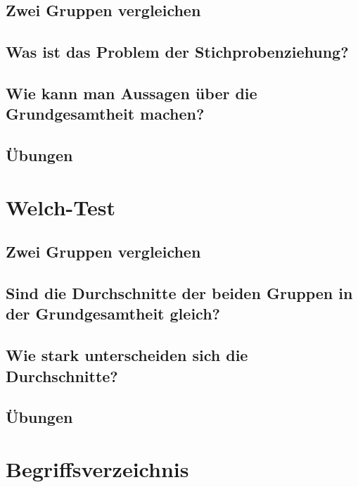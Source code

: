 \documentclass[
]{book}
\theoremstyle{definition}
\theoremstyle{definition}
\theoremstyle{definition}
\theoremstyle{definition}
\theoremstyle{remark}
\begin{document}
\section{Zwei Gruppen vergleichen}\label{zwei-gruppen-vergleichen}

\section{Was ist das Problem der Stichprobenziehung?}\label{was-ist-das-problem-der-stichprobenziehung}

\section{Wie kann man Aussagen über die Grundgesamtheit machen?}\label{wie-kann-man-aussagen-uxfcber-die-grundgesamtheit-machen}

\section{Übungen}\label{uxfcbungen-3}

\chapter{Welch-Test}\label{welch-test}

\section{Zwei Gruppen vergleichen}\label{zwei-gruppen-vergleichen-1}

\section{Sind die Durchschnitte der beiden Gruppen in der Grundgesamtheit gleich?}\label{sind-die-durchschnitte-der-beiden-gruppen-in-der-grundgesamtheit-gleich}

\section{Wie stark unterscheiden sich die Durchschnitte?}\label{wie-stark-unterscheiden-sich-die-durchschnitte}

\section{Übungen}\label{uxfcbungen-4}

\chapter*{Begriffsverzeichnis}\label{begriffsverzeichnis}
\end{document}
